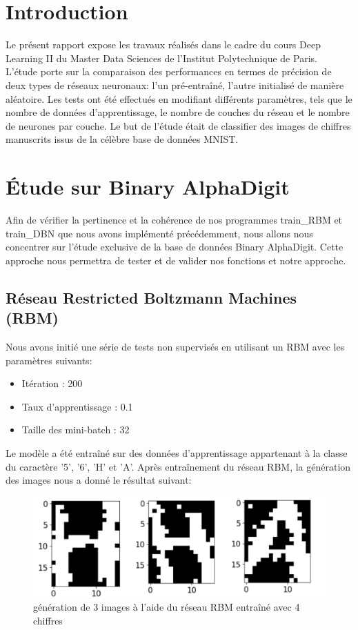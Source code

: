 \section{Introduction}
\label{sec:intro}
Le présent rapport expose les travaux réalisés dans le cadre du cours Deep Learning II du Master Data Sciences de l'Institut Polytechnique de Paris. \\
L'étude porte sur la comparaison des performances en termes de précision de deux types de réseaux neuronaux: l'un pré-entraîné, l'autre initialisé de manière aléatoire. Les tests ont été effectués en modifiant différents paramètres, tels que le nombre de données d'apprentissage, le nombre de couches du réseau et le nombre de neurones par couche. 
Le but de l'étude était de classifier des images de chiffres manuscrits issus de la célèbre base de données MNIST.

\section{Étude sur Binary AlphaDigit}
Afin de vérifier la pertinence et la cohérence de nos programmes train\_RBM et train\_DBN que nous avons implémenté précédemment, nous allons nous concentrer sur l'étude exclusive de la base de données Binary AlphaDigit. Cette approche nous permettra de tester et de valider nos fonctions et notre approche. 

\subsection{Réseau Restricted Boltzmann Machines (RBM)}
Nous avons initié une série de tests non supervisés en utilisant un RBM avec les paramètres suivants:
\begin{itemize}
    \item Itération : 200
    \item Taux d'apprentissage : 0.1
    \item Taille des mini-batch : 32
\end{itemize}

Le modèle a été entraîné sur des données d'apprentissage appartenant à la classe du caractère '5', '6', 'H' et 'A'. Après entraînement du réseau RBM, la génération des images nous a donné le résultat suivant: 
\begin{figure}[H]\includegraphics[width=140mm]{images/RBM.png}
\caption{génération de 3 images à l'aide du réseau RBM entraîné avec 4 chiffres}
\end{figure}

